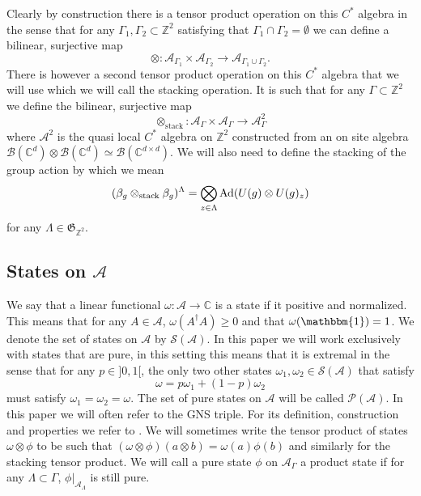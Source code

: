 \documentclass[12pt,a4paper,twoside]{article}
\let\originalleft\left
\let\originalright\right
\renewcommand{\left}{\mathopen{}\mathclose\bgroup\originalleft}
\renewcommand{\right}{\aftergroup\egroup\originalright}
\newcommand{\BB}{\mathcal B}
\newcommand{\PP}{\mathcal P}
\newcommand{\ZZ}{\mathbb Z}
\newcommand{\CC}{\mathbb C}
\renewcommand{\AA}{\mathcal A}
\newcommand{\id}{\mathbbm{1}}
\newcommand{\Ad}[1]{\textrm{Ad}\left(#1\right)}
\theoremstyle{definition}
\numberwithin{equation}{section}
\begin{document}
Clearly by construction there is a tensor product operation on this $C^*$ algebra in the sense that for any $\Gamma_1,\Gamma_2\subset\ZZ^2$ satisfying that $\Gamma_1\cap\Gamma_2=\emptyset$ we can define a bilinear, surjective map
\begin{equation}
	\otimes:\AA_{\Gamma_1}\times\AA_{\Gamma_2}\rightarrow \AA_{\Gamma_1\cup\Gamma_2}.
\end{equation}
There is however a second tensor product operation on this $C^*$ algebra that we will use which we will call the stacking operation. It is such that for any $\Gamma\subset\ZZ^2$ we define the bilinear, surjective map
\begin{equation}
	\otimes_{\text{stack}}:\AA_{\Gamma}\times\AA_{\Gamma}\rightarrow \AA^2_{\Gamma}
\end{equation}
where $\AA^2$ is the quasi local $C^*$ algebra on $\ZZ^2$ constructed from an on site algebra $\BB(\CC^d)\otimes\BB(\CC^d)\simeq \BB(\CC^{d\times d})$. We will also need to define the stacking of the group action by which we mean
\begin{equation}
	(\beta_g\otimes_{\text{stack}}\beta_g)^\Lambda=\bigotimes_{z\in\Lambda}\Ad{U(g)\otimes U(g)_z}
\end{equation}
for any $\Lambda\in\mathfrak{G}_{\ZZ^2}$.
\subsection{States on $\AA$}
We say that a linear functional $\omega:\AA\rightarrow \CC$ is a state if it positive and normalized. This means that for any $A\in\AA$, $\omega(A^\dagger A)\geq 0$ and that $\omega(\id)=1$. We denote the set of states on $\AA$ by $\mathcal{S}(\AA)$. In this paper we will work exclusively with states that are pure, in this setting this means that it is extremal in the sense that for any $p\in]0,1[$, the only two other states $\omega_1,\omega_2\in\mathcal{S}(\AA)$ that satisfy
\begin{equation}
	\omega=p\omega_1+(1-p)\omega_2
\end{equation}
must satisfy $\omega_1=\omega_2=\omega$. The set of pure states on $\AA$ will be called $\PP(\AA)$. In this paper we will often refer to the GNS triple. For its definition, construction and properties we refer to \cite{bratteli1979operator}. We will sometimes write the tensor product of states $\omega\otimes\phi$ to be such that $(\omega\otimes\phi)(a\otimes b)=\omega(a)\phi(b)$ and similarly for the stacking tensor product. We will call a pure state $\phi$ on $\AA_\Gamma$ a product state if for any $\Lambda\subset\Gamma$, $\phi|_{\AA_\Lambda}$ is still pure.
\end{document}

